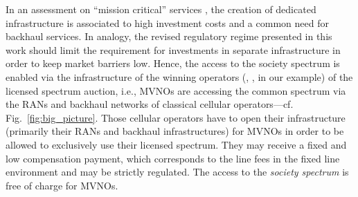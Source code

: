\documentclass[conference]{IEEEtran}
\begin{document}
In an assessment on ``mission critical'' services \cite{forge2013}, the creation of dedicated infrastructure is associated to high investment costs and a common need for backhaul services. In analogy,  the revised regulatory regime presented in this work should limit the requirement for investments in separate infrastructure in order to keep market barriers low. Hence, the access to the society spectrum is enabled via the infrastructure of the winning operators (, ,  in our example) of the licensed spectrum auction, i.e., MVNOs are accessing the common spectrum via the RANs and backhaul networks of classical cellular operators---cf. Fig.~\ref{fig:big_picture}. Those cellular operators have to open their infrastructure (primarily their RANs and backhaul infrastructures) for MVNOs in order to be allowed to exclusively use their licensed spectrum. They may receive a fixed and low compensation payment, which corresponds to the line fees in the fixed line environment and may be strictly regulated. The access to the  \textit{society spectrum} is free of charge for MVNOs.
\end{document}
